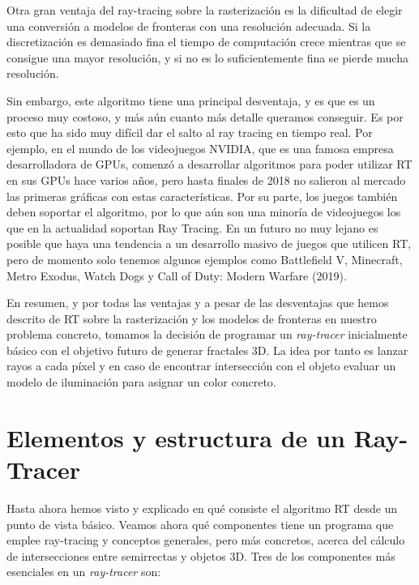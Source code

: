 Otra gran ventaja del ray-tracing sobre la rasterización es la dificultad de elegir una conversión a modelos de fronteras con una resolución adecuada. Si la discretización es demasiado fina el tiempo de computación crece mientras que se consigue una mayor resolución, y si no es lo suficientemente fina se pierde mucha resolución.

Sin embargo, este algoritmo tiene una principal desventaja, y es que es un proceso muy costoso, y más aún cuanto más detalle queramos conseguir. Es por esto que ha sido muy difícil dar el salto al ray tracing en tiempo real. Por ejemplo, en el mundo de los videojuegos NVIDIA, que es una famosa empresa desarrolladora de GPUs, comenzó a desarrollar algoritmos para poder utilizar RT en sus GPUs hace varios años, pero hasta finales de 2018 no salieron al mercado las primeras gráficas con estas características. Por su parte, los juegos también deben soportar el algoritmo, por lo que aún son una minoría de videojuegos los que en la actualidad soportan Ray Tracing. En un futuro no muy lejano es posible que haya una tendencia a un desarrollo masivo de juegos que utilicen RT, pero de momento solo tenemos algunos ejemplos como Battlefield V, Minecraft, Metro Exodus, Watch Dogs y Call of Duty: Modern Warfare (2019).

En resumen, y por todas las ventajas y a pesar de las desventajas que hemos descrito de RT sobre la rasterización y los modelos de fronteras en nuestro problema concreto, tomamos la decisión de programar un \textit{ray-tracer} inicialmente básico con el objetivo futuro de generar fractales 3D. La idea por tanto es lanzar rayos a cada píxel y en caso de encontrar intersección con el objeto evaluar un modelo de iluminación para asignar un color concreto.

\section{Elementos y estructura de un Ray-Tracer}
\label{section:elementos-RT}

Hasta ahora hemos visto y explicado en qué consiste el algoritmo RT desde un punto de vista básico. Veamos ahora qué componentes tiene un programa que emplee ray-tracing y conceptos generales, pero más concretos, acerca del cálculo de intersecciones entre semirrectas y objetos 3D. Tres de los componentes más esenciales en un \textit{ray-tracer} son:

